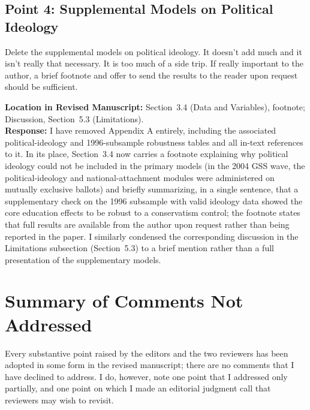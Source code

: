 \documentclass[11pt]{article}
\begin{document}
\subsection*{Point 4: Supplemental Models on Political Ideology}

\begin{reviewercomment}
Delete the supplemental models on political ideology. It doesn't add much and it isn't really that necessary. It is too much of a side trip. If really important to the author, a brief footnote and offer to send the results to the reader upon request should be sufficient.
\end{reviewercomment}

\noindent\textbf{Location in Revised Manuscript:} Section~3.4 (Data and Variables), footnote; Discussion, Section~5.3 (Limitations).\\[4pt]
\textbf{Response:} I have removed Appendix A entirely, including the associated political-ideology and 1996-subsample robustness tables and all in-text references to it. In its place, Section~3.4 now carries a footnote explaining why political ideology could not be included in the primary models (in the 2004 GSS wave, the political-ideology and national-attachment modules were administered on mutually exclusive ballots) and briefly summarizing, in a single sentence, that a supplementary check on the 1996 subsample with valid ideology data showed the core education effects to be robust to a conservatism control; the footnote states that full results are available from the author upon request rather than being reported in the paper. I similarly condensed the corresponding discussion in the Limitations subsection (Section~5.3) to a brief mention rather than a full presentation of the supplementary models.

\clearpage

\section*{Summary of Comments Not Addressed}

Every substantive point raised by the editors and the two reviewers has been adopted in some form in the revised manuscript; there are no comments that I have declined to address. I do, however, note one point that I addressed only partially, and one point on which I made an editorial judgment call that reviewers may wish to revisit.
\end{document}
